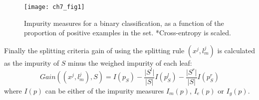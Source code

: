   \begin{figure}[t!]
 \texttt{[image: ch7\_fig1]}
 \caption{Impurity measures for a binary classification, as a function of the proportion of
 positive examples in the set. *Cross-entropy is scaled.\citep{Hastie2009} }
 \label{measures1}
 \end{figure} 

 Finally the splitting criteria gain of using the splitting rule $(x^j,l^j_m)$ is calculated as 
 the impurity of $S$ minus the weighed impurity of each leaf:
 \begin{equation}
 Gain((x^j,l^j_m),S)=I(p_S)-\frac{\vert S^l \vert}{\vert S \vert}I(p^l_S)
 -\frac{\vert S^r \vert}{\vert S \vert}I(p^r_S)
 \end{equation} 
 where $I(p)$ can be either of the impurity measures $I_m(p)$, $I_e(p)$ or $I_g(p)$.
 
